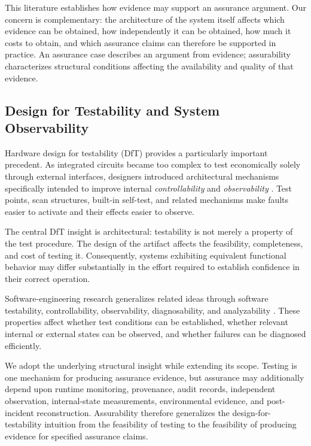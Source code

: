 This literature establishes how evidence may support an assurance argument.
Our concern is complementary: the architecture of the system itself affects which evidence can be obtained,
how independently it can be obtained, how much it costs to obtain, and which assurance claims can therefore be supported in practice.
An assurance case describes an argument from evidence;
assurability characterizes structural conditions affecting the availability and quality of that evidence.

\subsection{Design for Testability and System Observability}

Hardware design for testability (DfT) provides a particularly important precedent.
As integrated circuits became too complex to test economically solely through external interfaces, designers introduced architectural mechanisms specifically intended to improve internal \emph{controllability} and \emph{observability} \cite{williams1983testability, abramovici1990digitaltesting, ieeeDesignForTestability}. Test points, scan structures, built-in self-test, and related mechanisms make faults easier to activate and their effects easier to observe.

The central DfT insight is architectural: testability is not merely a property of the test procedure.
The design of the artifact affects the feasibility, completeness, and cost of testing it. Consequently, systems exhibiting equivalent functional behavior may differ substantially in the effort required to establish confidence in their correct operation.

Software-engineering research generalizes related ideas through software testability, controllability, observability, diagnosability, and analyzability \cite{binder1994designfortestability, freedman1991testability}. These properties affect whether test conditions can be established, whether relevant internal or external states can be observed, and whether failures can be diagnosed efficiently.

We adopt the underlying structural insight while extending its scope.
Testing is one mechanism for producing assurance evidence, but assurance may additionally depend upon runtime monitoring, provenance, audit records, independent observation, internal-state measurements, environmental evidence, and post-incident reconstruction. Assurability therefore generalizes the design-for-testability intuition from the feasibility of testing to the feasibility of producing evidence for specified assurance claims.

